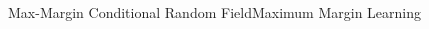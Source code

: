 \documentclass[first=dgreen,second=purple,logo=yellowexc]{aaltoslides}
\begin{document}
\begin{frame}{Max-Margin Conditional Random Field}{Maximum Margin Learning}
\begin{itemize}
\begin{columns}
\begin{column}{.3\linewidth}
\begin{figure}

\end{figure}
\end{column}
\end{columns}
\end{itemize}
\end{frame}
\end{document}
